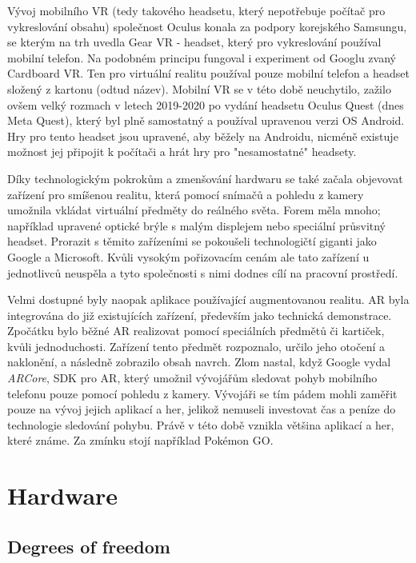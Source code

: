 Vývoj mobilního VR (tedy takového headsetu, který nepotřebuje počítač pro vykreslování obsahu) společnost Oculus konala za podpory korejského Samsungu, se kterým na trh uvedla Gear VR - headset, který pro vykreslování používal mobilní telefon. Na podobném principu fungoval i experiment od Googlu zvaný Cardboard VR. Ten pro virtuální realitu používal pouze mobilní telefon a headset složený z kartonu (odtud název). Mobilní VR se v této době neuchytilo, zažilo ovšem velký rozmach v letech 2019-2020 po vydání headsetu Oculus Quest (dnes Meta Quest), který byl plně samostatný a používal upravenou verzi OS Android. Hry pro tento headset jsou upravené, aby běžely na Androidu, nicméně existuje možnost jej připojit k počítači a hrát hry pro "nesamostatné" headsety. \cite{otechnice_3}

Díky technologickým pokrokům a zmenšování hardwaru se také začala objevovat zařízení pro smíšenou realitu, která pomocí snímačů a pohledu z kamery umožnila vkládat virtuální předměty do reálného světa. Forem měla mnoho; například upravené optické brýle s malým displejem nebo speciální průsvitný headset. Prorazit s těmito zařízeními se pokoušeli technologičtí giganti jako Google a Microsoft. Kvůli vysokým pořizovacím cenám ale tato zařízení u jednotlivců neuspěla a tyto společnosti s nimi dodnes cílí na pracovní prostředí. \cite{google_glass_mobilenet}

Velmi dostupné byly naopak aplikace používající augmentovanou realitu. AR byla integrována do již existujících zařízení, především jako technická demonstrace. Zpočátku bylo běžné AR realizovat pomocí speciálních předmětů či kartiček, kvůli jednoduchosti. Zařízení tento předmět rozpoznalo, určilo jeho otočení a naklonění, a následně zobrazilo obsah navrch. Zlom nastal, když Google vydal \textit{ARCore}, \gls{SDK} pro AR, který umožnil vývojářům sledovat pohyb mobilního telefonu pouze pomocí pohledu z kamery. Vývojáři se tím pádem mohli zaměřit pouze na vývoj jejich aplikací a her, jelikož nemuseli investovat čas a peníze do technologie sledování pohybu. Právě v této době vznikla většina aplikací a her, které známe. Za zmínku stojí například Pokémon GO. \cite{enwiki:1182789097}

\chapter{Hardware}

\section{Degrees of freedom}

